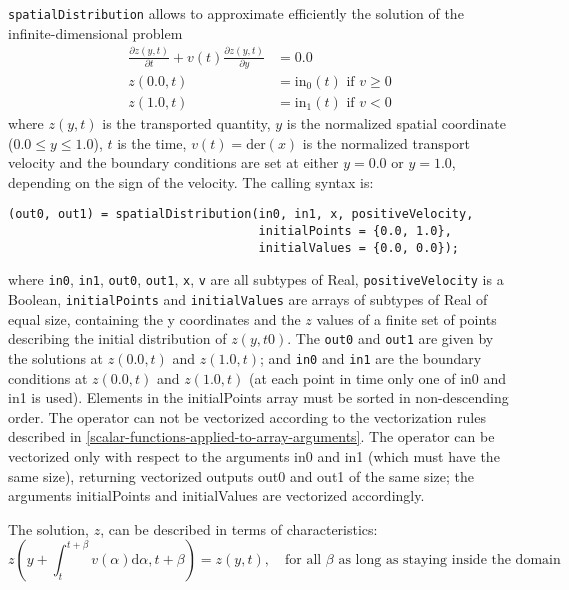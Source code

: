 \lstinline!spatialDistribution! allows to approximate efficiently the solution of the infinite-dimensional problem
\begin{align*}
\frac{\partial z(y,t)}{\partial t}+v(t)\frac{\partial z(y,t)}{\partial y} &= 0.0\\
z(0.0, t) &= \mathrm{in}_0(t) \text{ if $v\ge 0$}\\
z(1.0, t) &= \mathrm{in}_1(t) \text{ if $v<0$}
\end{align*}
where $z(y, t)$ is the transported quantity, $y$ is the
normalized spatial coordinate ($0.0 \le y \le 1.0$), $t$ is the
time, $v(t)=\mathrm{der}(x)$ is the normalized
transport velocity and the boundary conditions are set at either
$y=0.0$ or $y=1.0$, depending on the sign of the velocity.
The calling syntax is:
\begin{lstlisting}[language=modelica]
(out0, out1) = spatialDistribution(in0, in1, x, positiveVelocity,
                                   initialPoints = {0.0, 1.0},
                                   initialValues = {0.0, 0.0});
\end{lstlisting}
where \lstinline!in0!, \lstinline!in1!, \lstinline!out0!, \lstinline!out1!, \lstinline!x!, \lstinline!v! are all subtypes of Real,
\lstinline!positiveVelocity! is a Boolean, \lstinline!initialPoints! and \lstinline!initialValues! are
arrays of subtypes of Real of equal size, containing the y coordinates
and the $z$ values of a finite set of points describing the initial
distribution of $z(y, \mathit{t0})$. The \lstinline!out0! and \lstinline!out1! are given by
the solutions at $z(0.0, t)$ and $z(1.0, t)$; and \lstinline!in0! and \lstinline!in1!
are the boundary conditions at $z(0.0, t)$ and $z(1.0, t)$ (at
each point in time only one of in0 and in1 is used). Elements in the
initialPoints array must be sorted in non-descending order. The operator
can not be vectorized according to the vectorization rules described in
\cref{scalar-functions-applied-to-array-arguments}. The operator can be vectorized only with respect to the
arguments in0 and in1 (which must have the same size), returning
vectorized outputs out0 and out1 of the same size; the arguments
initialPoints and initialValues are vectorized accordingly.

The solution, $z$, can be described in terms of characteristics:
\begin{equation*}
z(y+\int_{t}^{t+\beta} v(\alpha) \mathrm{d}\alpha, t+\beta) = z(y, t),\quad\text{for all $\beta$ as long as staying inside the domain}
\end{equation*}

